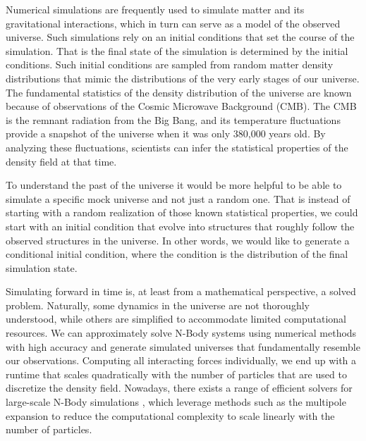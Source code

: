 \documentclass{article}
\begin{document}
Numerical simulations are frequently used to simulate matter and its gravitational interactions, which in turn can serve as a model of the observed universe. Such simulations rely on an initial conditions that set the course of the simulation. That is the final state of the simulation is determined by the initial conditions. Such initial conditions are sampled from random matter density distributions that mimic the distributions of the very early stages of our universe. The fundamental statistics of the density distribution of the universe are known because of observations of the Cosmic Microwave Background (CMB). The CMB is the remnant radiation from the Big Bang, and its temperature fluctuations provide a snapshot of the universe when it was only 380,000 years old. By analyzing these fluctuations, scientists can infer the statistical properties of the density field at that time. 

To understand the past of the universe it would be more helpful to be able to simulate a specific mock universe and not just a random one. That is instead of starting with a random realization of those known statistical properties, we could start with an initial condition that evolve into structures that roughly follow the observed structures in the universe. In other words, we would like to generate a conditional initial condition, where the condition is the distribution of the final simulation state.

Simulating forward in time is, at least from a mathematical perspective, a solved problem. Naturally, some dynamics in the universe are not thoroughly understood, while others are simplified to accommodate limited computational resources. We can approximately solve N-Body systems using numerical methods with high accuracy and generate simulated universes that fundamentally resemble our observations. Computing all interacting forces individually, we end up with a runtime that scales quadratically with the number of particles that are used to discretize the density field. Nowadays, there exists a range of efficient solvers for large-scale N-Body simulations \citep{potter2017pkdgrav3, springel2021simulating, garrison2021abacus}, which leverage methods such as the multipole expansion to reduce the computational complexity to scale linearly with the number of particles. 
\end{document}

